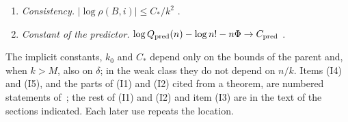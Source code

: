 \begin{enumerate}[({I}1)]
row and column constraints, ``$B(p\odot\delta)=BRg=0$'' and, ``in every original row,
$\sum_{c\in{\rm row}}p_c\delta_c=0$''; moreover, ``the constraint removed in each component is
recovered from the equality of the row and column sums''. In our notation, if
$B_{\rm RC}$ is that matrix, $B_{\rm RC}(p\odot d)=0$: $\sum_{e'\in R_i}p_{e'}d_{e'}=0$ in every
empty row and $\sum_{e'\in C_j}p_{e'}d_{e'}=0$ in every empty column.
\item \emph{Consistency.} $|\log\rho(B,i)|\le C_*/k^2$ \cite[Corollary~7.2 and Theorem~8.1]{pred}.
\item \emph{Constant of the predictor.} $\log Q_{\rm pred}(n)-\log n!-n\Phi\to C_{\rm pred}$
\cite[Theorems~1.1 and~5.7]{pred}.
\end{enumerate}
The implicit constants, $k_0$ and $C_*$ depend only on the bounds of the parent and, when $k>M$,
also on $\delta$; in the weak class they do not depend on $n/k$. Items (I4) and (I5), and the
parts of (I1) and (I2) cited from a theorem, are numbered statements of~\cite{pred}; the rest of
(I1) and (I2) and item (I3) are in the text of the sections indicated. Each later use repeats the
location.
